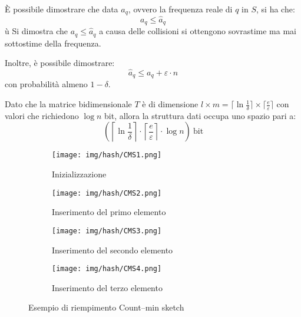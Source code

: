 È possibile dimostrare che data $a_q$, ovvero la frequenza reale di $q$ in $S$, si ha che:
\begin{equation}
    a_q \leq \hat{a}_q
\end{equation} ù
Si dimostra che $a_q \leq \hat{a}_q$ a causa delle collisioni si ottengono sovrastime ma mai sottostime della frequenza.

Inoltre, è possibile dimostrare:
\begin{equation}
    \hat{a}_q \leq a_q + \varepsilon \cdot n
\end{equation}
con probabilità almeno $1 - \delta$.

Dato che la matrice bidimensionale $T$ è di dimensione $l \times m = \lceil \ln \frac{1}{\delta} \rceil \times \lceil \frac{e}{\varepsilon} \rceil$ con valori che richiedono $\log n$ bit, allora la struttura dati occupa uno spazio pari a: 
\begin{equation}
    \left( \left\lceil \ln \frac{1}{\delta} \right\rceil \cdot \left\lceil \frac{e}{\varepsilon} \right\rceil \cdot \log n \right) \ \text{bit}
\end{equation}
\begin{figure}[!ht]
     \centering
     \begin{subfigure}[b]{0.45\textwidth}
         \centering
         \texttt{[image: img/hash/CMS1.png]}
         \caption{Inizializzazione}
     \end{subfigure}
     \hfill
     \begin{subfigure}[b]{0.45\textwidth}
         \centering
         \texttt{[image: img/hash/CMS2.png]}
         \caption{Inserimento del primo elemento}
     \end{subfigure}
     \hfill
     \begin{subfigure}[b]{0.45\textwidth}
         \centering
         \texttt{[image: img/hash/CMS3.png]}
         \caption{Inserimento del secondo elemento}
     \end{subfigure}
     \hfill
     \begin{subfigure}[b]{0.45\textwidth}
         \centering
         \texttt{[image: img/hash/CMS4.png]}
         \caption{Inserimento del terzo elemento}
     \end{subfigure}
     \caption{Esempio di riempimento Count–min sketch}
\end{figure}
